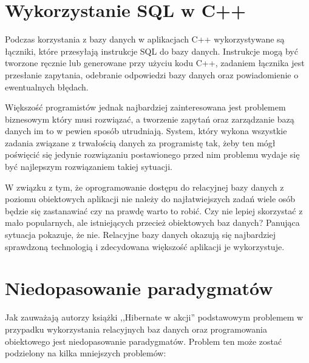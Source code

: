 \documentclass[12pt]{report}
\begin{document}
\section{Wykorzystanie SQL w C++}

Podczas korzystania z bazy danych w aplikacjach C++ wykorzystywane są łączniki, które przesyłają instrukcje SQL do bazy danych. Instrukcje mogą być tworzone ręcznie lub
generowane przy użyciu kodu C++, zadaniem łącznika jest przesłanie zapytania, odebranie odpowiedzi bazy danych oraz powiadomienie o ewentualnych błędach. 

Większość programistów jednak najbardziej zainteresowana jest problemem biznesowym który musi rozwiązać, a tworzenie zapytań oraz zarządzanie bazą danych im to w pewien
sposób utrudniają. System, który wykona wszystkie zadania zwią\-zane z trwałością danych za programistę tak, żeby ten mógł poświęcić się jedynie rozwiązaniu postawionego
przed nim problemu wydaje się być najlepszym rozwią\-zaniem takiej sytuacji.

W związku z tym, że oprogramowanie dostępu do relacyjnej bazy danych z poziomu obiektowych aplikacji nie należy do najłatwiejszych zadań wiele osób będzie się zastanawiać
czy na prawdę warto to robić. Czy nie lepiej skorzystać z mało popularnych, ale istniejących przecież obiektowych baz danych? Panująca sytuacja pokazuje, że nie. Relacyjne
bazy danych okazują się najbardziej spra\-wdzoną technologią i zdecydowana większość aplikacji je wykorzystuje.

\section{Niedopasowanie paradygmatów}

Jak zauważają autorzy książki ,,Hibernate w akcji'' \cite{hibernate} podstawowym problemem w przypadku wykorzystania relacyjnych baz danych oraz programowania 
obiektowego jest niedopasowanie paradygmatów. Problem ten może zostać podzielony na kilka mniejszych problemów:
\end{document}
